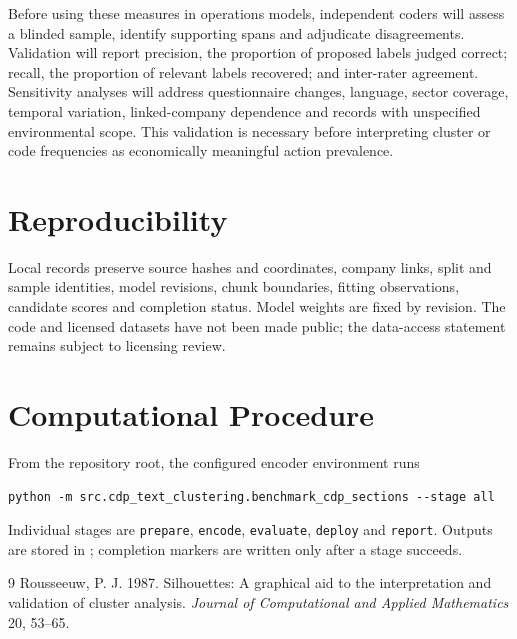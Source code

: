 \documentclass[12pt]{article}
\begin{document}
Before using these measures in operations models, independent coders will assess a blinded sample, identify supporting spans and adjudicate disagreements. Validation will report precision, the proportion of proposed labels judged correct; recall, the proportion of relevant labels recovered; and inter-rater agreement. Sensitivity analyses will address questionnaire changes, language, sector coverage, temporal variation, linked-company dependence and records with unspecified environmental scope. This validation is necessary before interpreting cluster or code frequencies as economically meaningful action prevalence.

\section{Reproducibility}
Local records preserve source hashes and coordinates, company links, split and sample identities, model revisions, chunk boundaries, fitting observations, candidate scores and completion status. Model weights are fixed by revision. The code and licensed datasets have not been made public; the data-access statement remains subject to licensing review.

\appendix
\section{Computational Procedure}
From the repository root, the configured encoder environment runs
\begin{verbatim}
python -m src.cdp_text_clustering.benchmark_cdp_sections --stage all
\end{verbatim}
Individual stages are \texttt{prepare}, \texttt{encode}, \texttt{evaluate}, \texttt{deploy} and \texttt{report}. Outputs are stored in ; completion markers are written only after a stage succeeds.

\begin{thebibliography}{9}
 Rousseeuw, P. J. 1987. Silhouettes: A graphical aid to the interpretation and validation of cluster analysis. \emph{Journal of Computational and Applied Mathematics} 20, 53--65.
\end{thebibliography}
\end{document}
